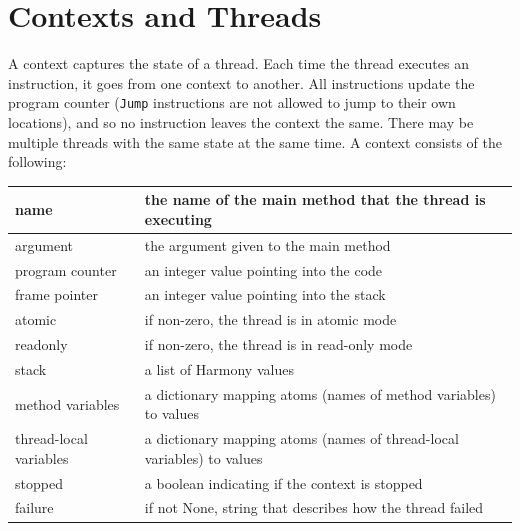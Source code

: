 \documentclass{report}
\begin{document}
\section{Contexts and Threads}
\label{app:context}

A context captures the state of a thread.  Each time the thread
executes an instruction, it goes from one context to another.
All instructions update the program counter (\texttt{Jump} instructions
are not allowed to jump to their own locations), and so no instruction
leaves the context the same.
There may be multiple threads
with the same state at the same time.
A context consists of the following:

\vspace{1em}
\begin{tabular}{|l|l|}
\hline
name & the name of the main method that the thread is executing \\
\hline
argument & the argument given to the main method \\
\hline
program counter & an integer value pointing into the code \\
\hline
frame pointer & an integer value pointing into the stack \\
\hline
atomic & if non-zero, the thread is in atomic mode \\
\hline
readonly & if non-zero, the thread is in read-only mode \\
\hline
stack & a list of Harmony values \\
\hline
method variables & a dictionary mapping atoms (names of method variables) to values \\
\hline
thread-local variables & a dictionary mapping atoms (names of thread-local variables) to values \\
\hline
stopped & a boolean indicating if the context is stopped \\
\hline
failure & if not None, string that describes how the thread failed \\
\hline
\end{tabular}
\vspace{1em}
\end{document}
